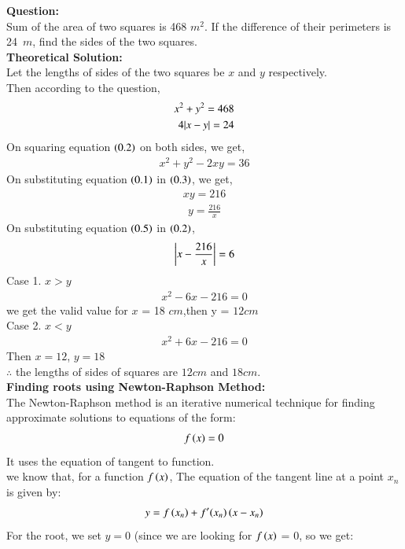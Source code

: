 \documentclass[journal]{IEEEtran}
\begin{document}
\textbf{Question:}
\\
Sum of the area of two squares is 468 $m^2$. If the difference of their perimeters is 24\ $m$, find the sides of the two squares.
\\
\textbf{ Theoretical Solution: }
\\
Let the lengths of sides of the two squares be $x$ and $y$ respectively.\\
Then according to the question,
\begin{align}
    x^2 + y^2 = 468 \\
    4{\left\vert x - y\right\vert} = 24
\end{align}
On squaring equation $\left(0.2\right)$ on both sides, we get,
\begin{align}
    x^2 + y^2 -2xy = 36
\end{align}
On substituting equation $\left(0.1\right)$ in $\left(0.3\right)$, we get,
\begin{align}
    xy = 216
\end{align}
\begin{align}
    y = \frac{216}{x}
\end{align}
On substituting equation $\left(0.5\right)$ in $\left(0.2\right)$,
\begin{align}
    \left\vert x - \frac{216}{x}\right\vert = 6
\end{align}
Case 1. $x > y$
\begin{align}
    x^2 - 6x - 216 =0
\end{align}
we get the valid value for $x$ = 18 $cm$,then y = $12 cm$\\
Case 2. $x < y$
\begin{align}
    x^2 + 6x -216 =0
\end{align}
Then $x = 12$, $y = 18$\\
$\therefore$ the lengths of sides of squares are $12 cm$ and $18cm$.\\
\textbf{Finding roots using Newton-Raphson Method:}
\\ The Newton-Raphson method is an iterative numerical technique for finding approximate solutions to equations of the form:
\begin{align}
    f\left(x\right) = 0
\end{align}
It uses the equation of tangent to function.\\
we know that, for a function $f\left(x\right)$, The equation of the tangent line at a point $x_n$ is given by:
\begin{align}
    y = f\left(x_n\right) + f^\prime(x_n)\left(x - x_n\right)
\end{align}
For the root, we set $y = 0$ (since we are looking for $f\left(x\right)$ = 0, so we get:
\end{document}
